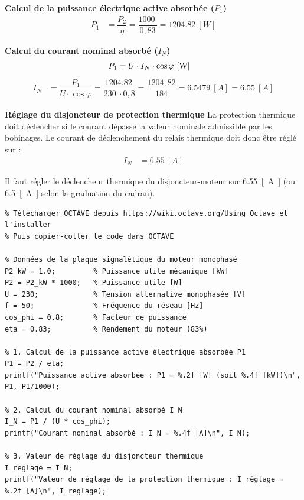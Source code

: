 \documentclass[a4paper,12pt,answers,addpoints]{exam}
\begin{document}
\begin{questions}
\begin{solution}
\textbf{Calcul de la puissance électrique active absorbée ($P_1$)}
\begin{align*}
P_1 &= \dfrac{P_2}{\eta} = \dfrac{\qty{1000}{}}{0,83} = \qty{1204,82}{[W]}
\end{align*}


\textbf{Calcul du courant nominal absorbé ($I_N$)}
\begin{align*}
P_1 &= U \cdot I_N \cdot \cos\varphi \ \unit[]{[\watt]}
\end{align*}
\begin{align*}
I_N &= \dfrac{P_1}{U \cdot \cos\varphi} = \dfrac{\qty{1204,82}{}}{\qty{230}{} \cdot 0,8} = \dfrac{1204,82}{184} = \qty{6,5479}{[A]} = \qty{6,55}{[A]}
\end{align*}


\textbf{Réglage du disjoncteur de protection thermique}
La protection thermique doit déclencher si le courant dépasse la valeur nominale admissible par les bobinages. Le courant de déclenchement du relais thermique doit donc être réglé sur :
\begin{align*}
I_N &= \qty{6,55}{[A]}
\end{align*}

Il faut régler le déclencheur thermique du disjoncteur-moteur sur \qty{6,55}{[A]} (ou \qty{6,5}{[A]} selon la graduation du cadran).

\begin{verbatim}
% Télécharger OCTAVE depuis https://wiki.octave.org/Using_Octave et l'installer
% Puis copier-coller le code dans OCTAVE

% Données de la plaque signalétique du moteur monophasé
P2_kW = 1.0;         % Puissance utile mécanique [kW]
P2 = P2_kW * 1000;   % Puissance utile [W]
U = 230;             % Tension alternative monophasée [V]
f = 50;              % Fréquence du réseau [Hz]
cos_phi = 0.8;       % Facteur de puissance
eta = 0.83;          % Rendement du moteur (83%)

% 1. Calcul de la puissance active électrique absorbée P1
P1 = P2 / eta;
printf("Puissance active absorbée : P1 = %.2f [W] (soit %.4f [kW])\n", P1, P1/1000);

% 2. Calcul du courant nominal absorbé I_N
I_N = P1 / (U * cos_phi);
printf("Courant nominal absorbé : I_N = %.4f [A]\n", I_N);

% 3. Valeur de réglage du disjoncteur thermique
I_reglage = I_N;
printf("Valeur de réglage de la protection thermique : I_réglage = %.2f [A]\n", I_reglage);
\end{verbatim}
\end{solution}
\end{questions}
\end{document}
